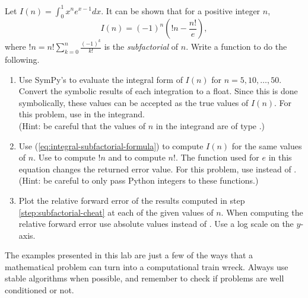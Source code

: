 \begin{problem}
Let $I(n) = \int_0^1 x^n e^{x - 1} dx$.
It can be shown that for a positive integer $n$,
\begin{equation}
I(n) = (-1)^n(!n - \frac{n!}{e}),
\label{eq:integral-subfactorial-formula}
\end{equation}
where $!n=n!\sum_{k=0}^{n} \frac{(-1)^k}{k!}$ is the \emph{subfactorial} of $n$.
Write a function to do the following.
\begin{enumerate}
\item Use SymPy's  to evaluate the integral form of $I(n)$ for $n=5,10,\ldots,50$.
Convert the symbolic results of each integration to a float.
Since this is done symbolically, these values can be accepted as the true values of $I(n)$.
For this problem, use  in the integrand.
\\(Hint: be careful that the values of $n$ in the integrand are of type .)

\item Use (\ref{eq:integral-subfactorial-formula}) to compute $I(n)$ for the same values of $n$.
Use  to compute $!n$ and  to compute $n!$.
The function used for $e$ in this equation changes the returned error value.
For this problem, use  instead of .
\\(Hint: be careful to only pass Python integers to these functions.)
\label{step:subfactorial-cheat}

\item Plot the relative forward error of the results computed in step \ref{step:subfactorial-cheat} at each of the given values of $n$.
When computing the relative forward error use absolute values instead of .
Use a log scale on the $y$-axis.

\end{enumerate}
\end{problem}

The examples presented in this lab are just a few of the ways that a mathematical problem can turn into a computational train wreck.
Always use stable algorithms when possible, and remember to check if problems are well conditioned or not.

